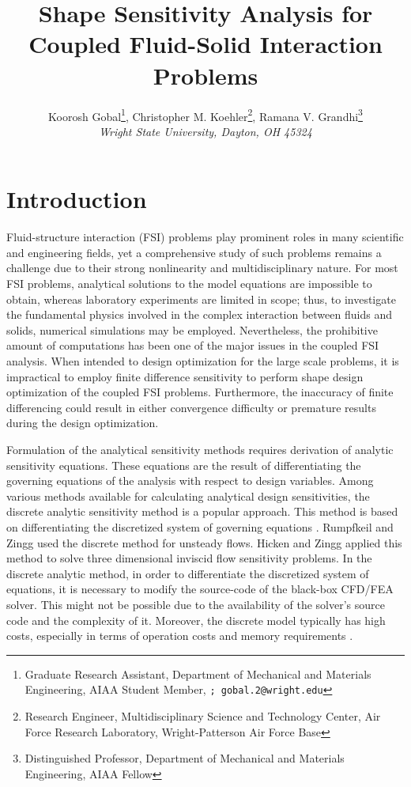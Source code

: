 \documentclass{aiaa-pretty}
\author[Gobal, Kohler, and Grandhi]{ %
Koorosh Gobal\thanks{Graduate Research Assistant, Department of Mechanical and Materials Engineering, AIAA Student Member, \texttt{; gobal.2@wright.edu}},
Christopher M. Koehler\thanks{Research Engineer, Multidisciplinary Science and Technology Center, Air Force Research Laboratory, Wright-Patterson Air Force Base},
Ramana V. Grandhi\thanks{Distinguished Professor, Department of Mechanical and Materials Engineering, AIAA Fellow}\\
\textit{Wright State University, Dayton, OH 45324}}
\title{Shape Sensitivity Analysis for Coupled Fluid-Solid Interaction Problems}
\begin{document}
\maketitle
\section{Introduction}
Fluid-structure interaction (FSI) problems play prominent roles in many scientific and engineering fields, yet a comprehensive study of such problems remains a challenge due to their strong nonlinearity and multidisciplinary nature. For most FSI problems, analytical solutions to the model equations are impossible to obtain, whereas laboratory experiments are limited in scope; thus, to investigate the fundamental physics involved in the complex interaction between fluids and solids, numerical simulations may be employed. Nevertheless, the prohibitive amount of computations has been one of the major issues in the coupled FSI analysis. When intended to design optimization for the large scale problems, it is impractical to employ finite difference sensitivity to perform shape design optimization of the coupled FSI problems. Furthermore, the inaccuracy of finite differencing could result in either convergence difficulty or premature results during the design optimization.

Formulation of the analytical sensitivity methods requires derivation of analytic sensitivity equations. These equations are the result of differentiating the governing equations of the analysis  with respect to design variables. Among various methods available for calculating analytical design sensitivities, the discrete analytic sensitivity method is a popular approach. This method is based on differentiating the discretized system of governing equations \cite{martins2013review}. Rumpfkeil and Zingg \cite{rumpfkeil2010optimal} used the discrete method for unsteady flows. Hicken and Zingg \cite{hicken2010induced} applied this method to solve three dimensional inviscid flow sensitivity problems. In the discrete analytic method, in order to differentiate the discretized system of equations, it is necessary to modify the source-code of the black-box CFD/FEA solver. This might not be possible due to the availability of the solver's source code and the complexity of it. Moreover, the discrete model typically has high costs, especially in terms of operation costs and memory requirements \cite{peter2010numerical}.
\end{document}
